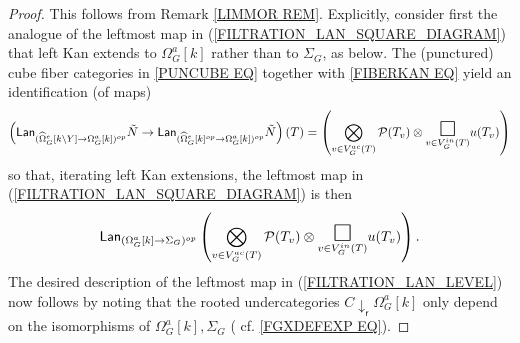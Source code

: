 \documentclass[a4paper,10pt
,draft
]{article}%
\numberwithin{equation}{section}
\numberwithin{figure}{section}
\theoremstyle{definition} %
\newcommand{\F}{\ensuremath{\mathcal F}}
\renewcommand{\P}{\ensuremath{\mathcal P}}
\newcommand{\1}{\ensuremath{\mathbbm 1}}%
\begin{document}
\begin{proof}
This follows from Remark \ref{LIMMOR REM}.
Explicitly,
consider first the analogue of the leftmost map in 
(\ref{FILTRATION_LAN_SQUARE_DIAGRAM}) 
that left Kan extends to 
$\Omega_G^a[k]$ rather than to $\Sigma_G$, as below.
The (punctured) cube fiber categories in
\eqref{PUNCUBE EQ} together with \eqref{FIBERKAN EQ} yield
an identification (of maps)
\[
\left(\mathsf{Lan}_{
	(\widehat{\Omega}_{G}^e[k \mathbin{\backslash} Y]
	\to \Omega^a_G[k])^{op}}\tilde{N}
	\to
\mathsf{Lan}_{
	(\widehat{\Omega}_{G}^e[k]^{op}
	\to \Omega^a_G[k])^{op}
	}\tilde{N}\right)(T)
=
\left(
	\bigotimes\limits_{v \in V_{G}^{ac}(T)}\P(T_v) \otimes
	\underset{v \in V_{G}^{in}(T)}
	{\mathlarger{\mathlarger{\mathlarger{\square}}}}
	u(T_v)
\right)
\]
so that, iterating left Kan extensions,
the leftmost map in 
(\ref{FILTRATION_LAN_SQUARE_DIAGRAM}) is then
\begin{equation}\label{FILTINTALT EQ}
	\mathsf{Lan}_{(\Omega_G^a[k] \to \Sigma_G)^{op}}
	\left(
		\bigotimes\limits_{v \in V_{G}^{ac}(T)}\P(T_v) \otimes
		\underset{v \in V_{G}^{in}(T)}
		{\mathlarger{\mathlarger{\mathlarger{\square}}}}
		u(T_v)
	\right).
\end{equation}
The desired description of the leftmost map in (\ref{FILTRATION_LAN_LEVEL})
now follows by noting that the rooted undercategories
$C \downarrow_{\mathsf{r}} \Omega_G^a[k]$
only depend on the isomorphisms 
of $\Omega_G^a[k],\Sigma_G$
(%
cf. \eqref{FGXDEFEXP EQ}).
\end{proof}



\renewcommand{\F}{\mathcal F}


\end{document}
